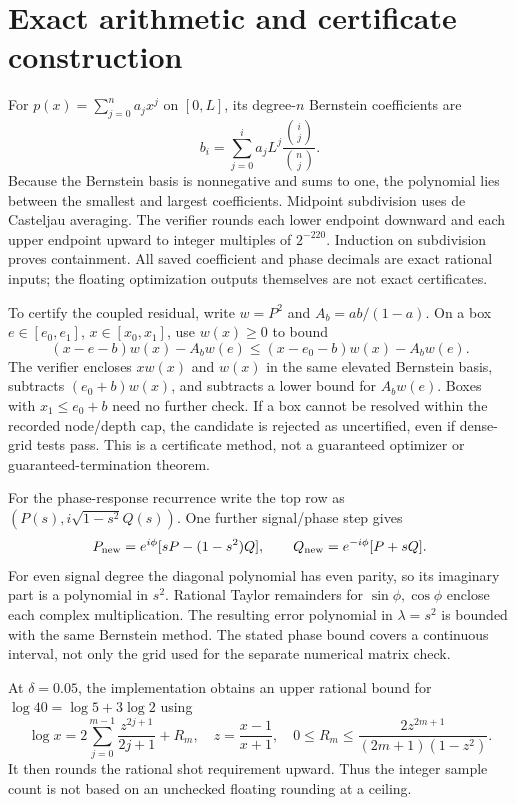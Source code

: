 \section{Exact arithmetic and certificate construction}
For $p(x)=\sum_{j=0}^n a_jx^j$ on $[0,L]$, its degree-$n$ Bernstein
coefficients are
\[
 b_i=\sum_{j=0}^i a_j L^j\frac{\binom ij}{\binom nj}.
\]
Because the Bernstein basis is nonnegative and sums to one, the
polynomial lies between the smallest and largest coefficients. Midpoint
subdivision uses de Casteljau averaging. The verifier rounds each lower
endpoint downward and each upper endpoint upward to integer multiples
of $2^{-220}$. Induction on subdivision proves containment.
All saved coefficient and phase decimals are exact rational inputs;
the floating optimization outputs themselves are not exact certificates.

To certify the coupled residual, write $w=P^2$ and $A_b=ab/(1-a)$.
On a box $e\in[e_0,e_1]$, $x\in[x_0,x_1]$, use $w(x)\geq0$ to bound
\[
 (x-e-b)w(x)-A_bw(e)
 \leq (x-e_0-b)w(x)-A_bw(e).
\]
The verifier encloses $xw(x)$ and $w(x)$ in the same elevated Bernstein
basis, subtracts $(e_0+b)w(x)$, and subtracts a lower bound for $A_bw(e)$.
Boxes with $x_1\leq e_0+b$ need no further check. If a box cannot be
resolved within the recorded node/depth cap, the candidate is rejected
as uncertified, even if dense-grid tests pass. This is a certificate
method, not a guaranteed optimizer or guaranteed-termination theorem.

For the phase-response recurrence write the top row as
$(P(s),i\sqrt{1-s^2}Q(s))$. One further signal/phase step gives
\[
 P_{\rm new}=e^{i\phi}[sP-(1-s^2)Q],\qquad
 Q_{\rm new}=e^{-i\phi}[P+sQ].
\]
For even signal degree the diagonal polynomial has even parity, so its
imaginary part is a polynomial in $s^2$. Rational Taylor remainders for
$\sin\phi,\cos\phi$ enclose each complex multiplication. The resulting
error polynomial in $\lambda=s^2$ is bounded with the same Bernstein
method. The stated phase bound covers a continuous interval, not only
the grid used for the separate numerical matrix check.

At $\delta=0.05$, the implementation obtains an upper rational bound
for $\log40=\log5+3\log2$ using
\[
 \log x=2\sum_{j=0}^{m-1}\frac{z^{2j+1}}{2j+1}+R_m,
 \quad z=\frac{x-1}{x+1},\quad
 0\leq R_m\leq\frac{2z^{2m+1}}{(2m+1)(1-z^2)}.
\]
It then rounds the rational shot requirement upward. Thus the integer
sample count is not based on an unchecked floating rounding at a ceiling.


